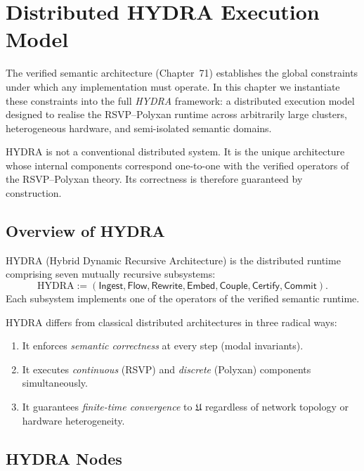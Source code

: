 \chapter{Distributed HYDRA Execution Model}
\label{ch:72}

The verified semantic architecture (Chapter~71) establishes the global 
constraints under which any implementation must operate.  
In this chapter we instantiate these constraints into the full 
\emph{HYDRA} framework: a distributed execution model designed to 
realise the RSVP--Polyxan runtime across arbitrarily large clusters, 
heterogeneous hardware, and semi-isolated semantic domains.

HYDRA is not a conventional distributed system.  
It is the unique architecture whose internal components correspond 
one-to-one with the verified operators of the RSVP--Polyxan theory.  
Its correctness is therefore guaranteed by construction.

\section{Overview of HYDRA}

\begin{definition}[HYDRA]
HYDRA (Hybrid Dynamic Recursive Architecture) is the distributed runtime 
comprising seven mutually recursive subsystems:
\[
\mathrm{HYDRA}
  := (\mathsf{Ingest}, \mathsf{Flow}, \mathsf{Rewrite},
      \mathsf{Embed}, \mathsf{Couple}, \mathsf{Certify}, \mathsf{Commit}).
\]
Each subsystem implements one of the operators of the verified semantic runtime.  
\end{definition}

HYDRA differs from classical distributed architectures in three radical ways:

\begin{enumerate}
\item It enforces \emph{semantic correctness} at every step (modal invariants).
\item It executes \emph{continuous} (RSVP) and \emph{discrete} (Polyxan) 
      components simultaneously.
\item It guarantees \emph{finite-time convergence} to $\mathfrak{U}$ 
      regardless of network topology or hardware heterogeneity.
\end{enumerate}

\section{HYDRA Nodes}

